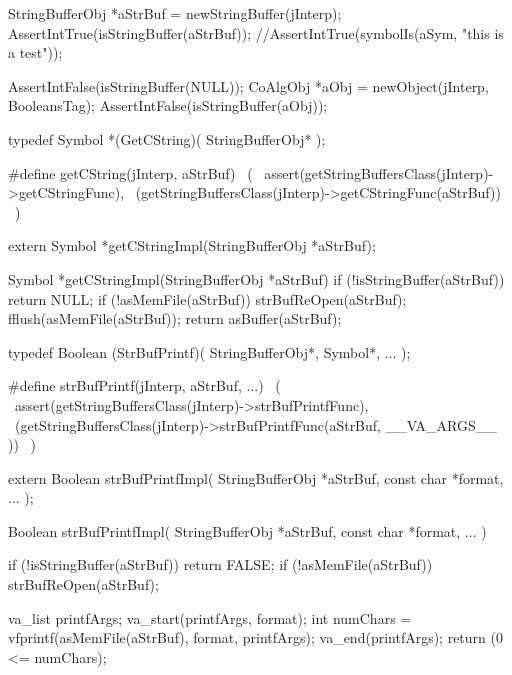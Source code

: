 
\startCTest
  StringBufferObj *aStrBuf = newStringBuffer(jInterp);
  AssertIntTrue(isStringBuffer(aStrBuf));
  //AssertIntTrue(symbolIs(aSym, "this is a test"));
\stopCTest
\stopTestCase

\startCTest
  AssertIntFalse(isStringBuffer(NULL));
  CoAlgObj *aObj = newObject(jInterp, BooleansTag);
  AssertIntFalse(isStringBuffer(aObj));
\stopCTest
\stopTestCase
\stopTestSuite


\startCHeader
typedef Symbol *(GetCString)(
  StringBufferObj*
);

#define getCString(jInterp, aStrBuf)                          \
  (                                                           \
    assert(getStringBuffersClass(jInterp)->getCStringFunc),   \
    (getStringBuffersClass(jInterp)->getCStringFunc(aStrBuf)) \
  )
\stopCHeader

\setCHeaderStream{private}
\startCHeader
extern Symbol *getCStringImpl(StringBufferObj *aStrBuf);
\stopCHeader
\setCHeaderStream{public}

\startCCode
Symbol *getCStringImpl(StringBufferObj *aStrBuf) {
  if (!isStringBuffer(aStrBuf)) return NULL;
  if (!asMemFile(aStrBuf)) strBufReOpen(aStrBuf);
  fflush(asMemFile(aStrBuf));
  return asBuffer(aStrBuf);
}
\stopCCode

\stopTestSuite

\startTestSuite[strBufPrintf]

\startCHeader
typedef Boolean (StrBufPrintf)(
  StringBufferObj*,
  Symbol*,
  ...
);

#define strBufPrintf(jInterp, aStrBuf, ...)                                   \
  (                                                                           \
    assert(getStringBuffersClass(jInterp)->strBufPrintfFunc),                 \
    (getStringBuffersClass(jInterp)->strBufPrintfFunc(aStrBuf, __VA_ARGS__ )) \
  )
\stopCHeader

\startCHeader
extern Boolean strBufPrintfImpl(
  StringBufferObj   *aStrBuf,
  const char        *format, 
  ...
);
\stopCHeader
\setCHeaderStream{public}

\startCCode
Boolean strBufPrintfImpl(
  StringBufferObj   *aStrBuf,
  const char        *format,
  ...
) {
  if (!isStringBuffer(aStrBuf)) return FALSE;
  if (!asMemFile(aStrBuf)) strBufReOpen(aStrBuf);
  
  va_list printfArgs;
  va_start(printfArgs, format);
  int numChars = vfprintf(asMemFile(aStrBuf), format, printfArgs);
  va_end(printfArgs);
  return (0 <= numChars);
}
\stopCCode

